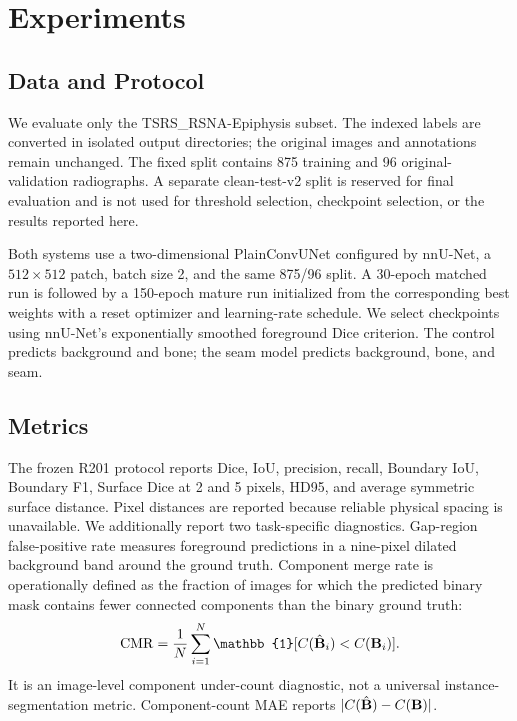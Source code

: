 \section{Experiments}

\subsection{Data and Protocol}

We evaluate only the TSRS\_RSNA-Epiphysis subset. The indexed labels are converted in isolated output directories; the original images and annotations remain unchanged. The fixed split contains 875 training and 96 original-validation radiographs. A separate clean-test-v2 split is reserved for final evaluation and is not used for threshold selection, checkpoint selection, or the results reported here.

Both systems use a two-dimensional PlainConvUNet configured by nnU-Net, a $512\times512$ patch, batch size 2, and the same 875/96 split. A 30-epoch matched run is followed by a 150-epoch mature run initialized from the corresponding best weights with a reset optimizer and learning-rate schedule. We select checkpoints using nnU-Net's exponentially smoothed foreground Dice criterion. The control predicts background and bone; the seam model predicts background, bone, and seam.

\subsection{Metrics}

The frozen R201 protocol reports Dice, IoU, precision, recall, Boundary IoU, Boundary F1, Surface Dice at 2 and 5 pixels, HD95, and average symmetric surface distance. Pixel distances are reported because reliable physical spacing is unavailable. We additionally report two task-specific diagnostics. Gap-region false-positive rate measures foreground predictions in a nine-pixel dilated background band around the ground truth. Component merge rate is operationally defined as the fraction of images for which the predicted binary mask contains fewer connected components than the binary ground truth:
\begin{equation}
\mathrm{CMR}=\frac{1}{N}\sum_{i=1}^{N}\mathbb{1}[C(\hat{\B}_i)<C(\B_i)].
\end{equation}
It is an image-level component under-count diagnostic, not a universal instance-segmentation metric. Component-count MAE reports $|C(\hat{\mathbf{B}})-C(\mathbf{B})|$.

